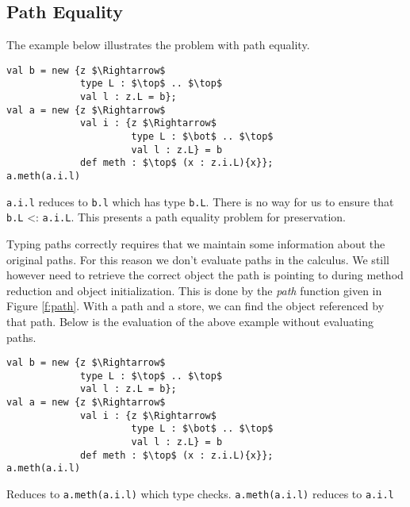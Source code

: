 \documentclass{llncs}
\begin{document}
\subsection{Path Equality}
\label{s:patheq}
The example below illustrates the problem with path equality.
\begin{lstlisting}[mathescape, style=custom_lang]
val b = new {z $\Rightarrow$
             type L : $\top$ .. $\top$
             val l : z.L = b};
val a = new {z $\Rightarrow$
             val i : {z $\Rightarrow$
                      type L : $\bot$ .. $\top$
                      val l : z.L} = b
             def meth : $\top$ (x : z.i.L){x}};
a.meth(a.i.l)
\end{lstlisting}
\texttt{a.i.l} reduces to \texttt{b.l} which has type \texttt{b.L}. 
There is no way for us to ensure that \texttt{b.L} <: \texttt{a.i.L}.
This presents a path equality problem for preservation.

Typing paths correctly requires that we maintain some information 
about the original paths. For this reason we don't evaluate paths 
in the calculus. We still however need to retrieve the correct object 
the path is pointing to during method reduction and object initialization. 
This is done by the \emph{path} function given in Figure \ref{f:path}. 
With a path and a store, we can find the object referenced by that path.
Below is the evaluation of the above example without evaluating paths.
\begin{lstlisting}[mathescape, style=custom_lang]
val b = new {z $\Rightarrow$
             type L : $\top$ .. $\top$
             val l : z.L = b};
val a = new {z $\Rightarrow$
             val i : {z $\Rightarrow$
                      type L : $\bot$ .. $\top$
                      val l : z.L} = b
             def meth : $\top$ (x : z.i.L){x}};
a.meth(a.i.l)
\end{lstlisting}
Reduces to \texttt{a.meth(a.i.l)} which type checks. \texttt{a.meth(a.i.l)}
reduces to \texttt{a.i.l}
\end{document}
